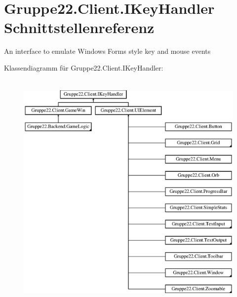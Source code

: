 \hypertarget{interface_gruppe22_1_1_client_1_1_i_key_handler}{\section{Gruppe22.\-Client.\-I\-Key\-Handler Schnittstellenreferenz}
\label{interface_gruppe22_1_1_client_1_1_i_key_handler}
}


An interface to emulate Windows Forms style key and mouse events  


Klassendiagramm für Gruppe22.\-Client.\-I\-Key\-Handler\-:\begin{figure}[H]
\begin{center}
\leavevmode
\includegraphics[height=12.000000cm]{interface_gruppe22_1_1_client_1_1_i_key_handler}
\end{center}
\end{figure}
